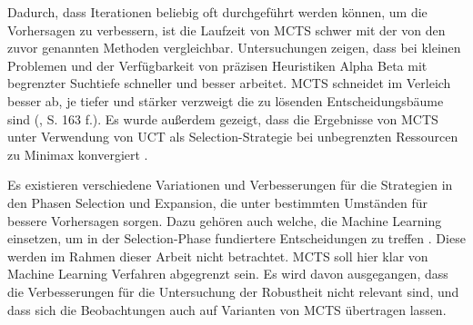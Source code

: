 Dadurch, dass Iterationen beliebig oft durchgeführt werden können, um die Vorhersagen zu verbessern, ist die Laufzeit von MCTS schwer mit der von den zuvor genannten Methoden vergleichbar. Untersuchungen zeigen, dass bei kleinen Problemen und der Verfügbarkeit von präzisen Heuristiken Alpha Beta mit begrenzter Suchtiefe schneller und besser arbeitet. MCTS schneidet im Verleich besser ab, je tiefer und stärker verzweigt die zu lösenden Entscheidungsbäume sind (\cite{Russell.2020}, S. 163 f.). Es wurde außerdem gezeigt, dass die Ergebnisse von MCTS unter Verwendung von UCT als Selection-Strategie bei unbegrenzten Ressourcen zu Minimax konvergiert \cite{Browne.2012}.

Es existieren verschiedene Variationen und Verbesserungen für die Strategien in den Phasen Selection und Expansion, die unter bestimmten Umständen für bessere Vorhersagen sorgen. Dazu gehören auch welche, die Machine Learning einsetzen, um in der Selection-Phase fundiertere Entscheidungen zu treffen \cite{Browne.2012}. Diese werden im Rahmen dieser Arbeit nicht betrachtet. MCTS soll hier klar von Machine Learning Verfahren abgegrenzt sein. Es wird davon ausgegangen, dass die Verbesserungen für die Untersuchung der Robustheit nicht relevant sind, und dass sich die Beobachtungen auch auf Varianten von MCTS übertragen lassen.
